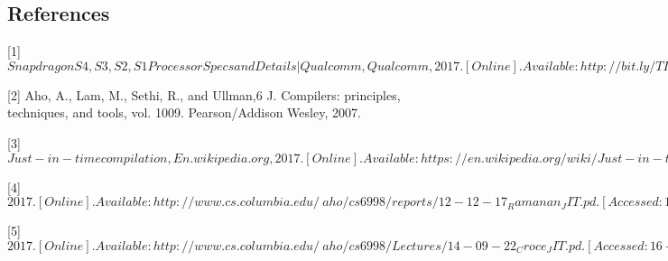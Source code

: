 \documentclass{article}
\begin{document}
\subsection{References}{
[1] $Snapdragon S4, S3, S2, S1 Processor Specs and Details | Qualcomm, Qualcomm, 2017. [Online]. Available: http://bit.ly/TIDHMK. [Accessed: 16- Apr- 2017].$

[2] Aho, A., Lam, M., Sethi, R., and Ullman,6 J. Compilers: principles, techniques, and tools, vol. 1009. Pearson/Addison Wesley, 2007.

[3]$ Just-in-time compilation, En.wikipedia.org, 2017. [Online]. Available: https://en.wikipedia.org/wiki/Just-in-time_compilation. [Accessed: 16- Apr- 2017].$

[4] $2017. [Online]. Available: http://www.cs.columbia.edu/~aho/cs6998/reports/12-12-17_Ramanan_JIT.pd. [Accessed: 16- Apr- 2017].$

[5]$ 2017. [Online]. Available: http://www.cs.columbia.edu/~aho/cs6998/Lectures/14-09-22_Croce_JIT.pd. [Accessed: 16- Apr- 2017].$
}
\end{document}
